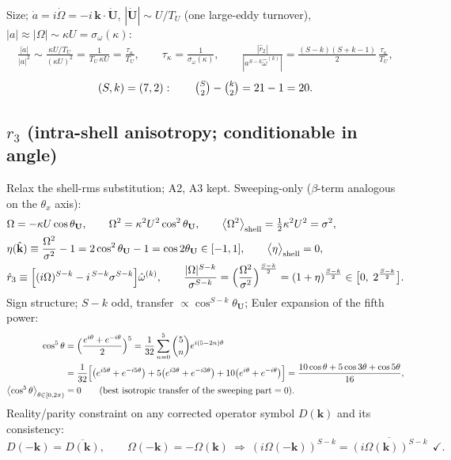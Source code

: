 \documentclass[11pt]{article}
\begin{document}
Size; $\dot a=i\dot\Omega=-i\,\mathbf{k}\!\cdot\!\dot{\mathbf{U}}$,
$|\dot{\mathbf U}|\sim U/T_U$ (one large-eddy turnover),
$|a|\approx|\Omega|\sim\kappa U=\sigma_\omega(\kappa)$:
\begin{align}
\frac{|\dot a|}{|a|^{2}}
\sim\frac{\kappa U/T_U}{(\kappa U)^{2}}
=\frac{1}{T_U\,\kappa U}
=\frac{\tau_\kappa}{T_U},\qquad
\tau_\kappa=\frac{1}{\sigma_\omega(\kappa)},\qquad
\frac{|\hat r_2|}{|a^{S-k}\hat\omega^{(k)}|}
=\frac{(S-k)(S+k-1)}{2}\,\frac{\tau_\kappa}{T_U},
\end{align}
\begin{equation}
(S,k)=(7,2):\qquad \tbinom{S}{2}-\tbinom{k}{2}=21-1=20 .
\end{equation}

\subsection*{$r_3$ (intra-shell anisotropy; conditionable in angle)}
Relax the shell-rms substitution; A2, A3 kept.
Sweeping-only ($\beta$-term analogous on the $\theta_x$ axis):
\begin{align}
&\Omega=-\kappa U\cos\theta_{\mathbf U},\qquad
\Omega^{2}=\kappa^{2}U^{2}\cos^{2}\theta_{\mathbf U},\qquad
\bigl\langle\Omega^{2}\bigr\rangle_{\mathrm{shell}}
=\tfrac12\kappa^{2}U^{2}=\sigma^{2},\\
&\eta(\hat{\mathbf k})
\equiv\frac{\Omega^{2}}{\sigma^{2}}-1
=2\cos^{2}\theta_{\mathbf U}-1=\cos2\theta_{\mathbf U}\in[-1,1],\qquad
\bigl\langle\eta\bigr\rangle_{\mathrm{shell}}=0,\\
&\hat r_3
\equiv\Bigl[(i\Omega)^{S-k}-i^{\,S-k}\sigma^{S-k}\Bigr]
\hat\omega^{(k)},\qquad
\frac{|\Omega|^{S-k}}{\sigma^{S-k}}
=\Bigl(\frac{\Omega^{2}}{\sigma^{2}}\Bigr)^{\frac{S-k}{2}}
=(1+\eta)^{\frac{S-k}{2}}
\in\bigl[0,\;2^{\frac{S-k}{2}}\bigr].
\end{align}
Sign structure; $S-k$ odd, transfer $\propto\cos^{S-k}\theta_{\mathbf U}$;
Euler expansion of the fifth power:
\begin{align}
\cos^{5}\theta
&=\Bigl(\frac{e^{i\theta}+e^{-i\theta}}{2}\Bigr)^{5}
=\frac{1}{32}\sum_{n=0}^{5}\binom{5}{n}e^{i(5-2n)\theta}\notag\\
&=\frac{1}{32}\Bigl[\bigl(e^{i5\theta}+e^{-i5\theta}\bigr)
+5\bigl(e^{i3\theta}+e^{-i3\theta}\bigr)
+10\bigl(e^{i\theta}+e^{-i\theta}\bigr)\Bigr]
=\frac{10\cos\theta+5\cos3\theta+\cos5\theta}{16},\\
\bigl\langle\cos^{5}\theta\bigr\rangle_{\theta\in[0,2\pi)}
&=0
\qquad(\text{best isotropic transfer of the sweeping part}=0).
\end{align}
Reality/parity constraint on any corrected operator symbol $D(\mathbf k)$
and its consistency:
\begin{equation}
D(-\mathbf{k})=\overline{D(\mathbf{k})},\qquad
\Omega(-\mathbf{k})=-\Omega(\mathbf{k})
\ \Rightarrow\
(i\Omega(-\mathbf{k}))^{S-k}
=\overline{(i\Omega(\mathbf{k}))^{S-k}}\ \ \checkmark .
\end{equation}
\end{document}
